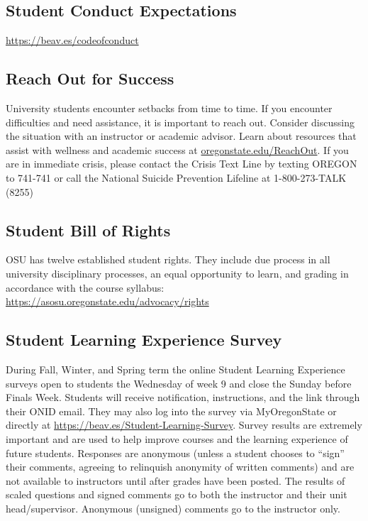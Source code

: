 \documentclass[10pt]{article}
\begin{document}
\subsection*{Student Conduct Expectations}
\url{https://beav.es/codeofconduct}

\subsection*{Reach Out for Success}
University students encounter setbacks from time to time. If you encounter difficulties and need 
assistance, it is important to reach out. Consider discussing the situation with an instructor or academic 
advisor.
 Learn about resources that assist with wellness and academic success at 
\url{oregonstate.edu/ReachOut}.
 If you are in immediate crisis, please contact the Crisis Text Line by texting 
OREGON to 741-741 or call the National Suicide Prevention Lifeline at 1-800-273-TALK (8255)

\subsection*{Student Bill of Rights}
OSU has twelve established student rights. They include due process in all university disciplinary processes, an equal opportunity to learn, and grading in accordance with the course syllabus: \url{https://asosu.oregonstate.edu/advocacy/rights}

\subsection*{Student Learning Experience Survey}
During Fall, Winter, and Spring term the online Student Learning Experience surveys open to students the Wednesday of week 9 and close the Sunday before Finals Week. Students will receive notification, instructions, and the link through their ONID email. They may also log into the survey via MyOregonState or directly at \url{https://beav.es/Student-Learning-Survey}. Survey results are extremely important and are used to help improve courses and the learning experience of future students. Responses are anonymous (unless a student chooses to ``sign'' their comments, agreeing to relinquish anonymity of written comments) and are not available to instructors until after grades have been posted. The results of scaled questions and signed comments go to both the instructor and their unit head/supervisor. Anonymous (unsigned) comments go to the instructor only.
\end{document}

